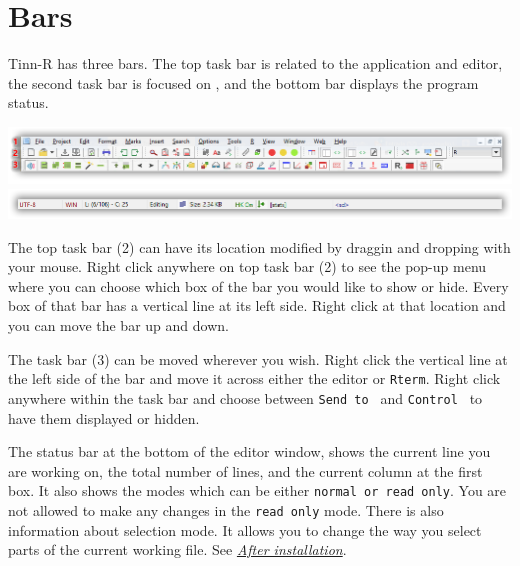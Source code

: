 
\section{Bars}

Tinn-R has three bars. The top task bar is related to the application and editor,
the second task bar is focused on \RR{}, and the bottom bar displays the program status.

\includegraphics[scale=0.50]{./res/parts_02.png}
\includegraphics[scale=0.50]{./res/status_bar.png}

The top task bar (2) can have its location modified by draggin and dropping with your mouse.
Right click anywhere on top task bar (2) to see the pop-up menu where you can choose which box
of the bar you would like to show or hide. Every box of that bar has a vertical line at its left side.
Right click at that location and you can move the bar up and down.

The \RR{} task bar (3) can be moved wherever you wish. Right click the vertical line at the left side of the
bar and move it across either the editor or \texttt{Rterm}. Right click anywhere within the \RR{} task bar and choose between
\texttt{Send to \RR{}} and \texttt{Control \RR{}} to have them displayed or hidden.

The status bar at the bottom of the editor window, shows the current line you are working on,
the total number of lines, and the current column at the first box.
It also shows the modes which can be either \texttt{normal or read only}.
You are not allowed to make any changes in the \texttt{read only} mode.
There is also information about selection mode. It allows you to change the way you select parts of the current working file.
See \textit{\href{\#secrets\_after\_installation}{After installation}}.
